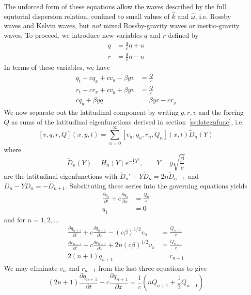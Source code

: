 \documentclass{jknotes}
\begin{document}
The unforced form of these equations allow the waves described by the full
equtorial dispersion relation, confined to small values of $\hat{k}$ and
$\hat{\omega}$, i.e. Rossby waves and Kelvin waves, but \emph{not} mixed
Rossby-gravity waves or inertio-gravity waves. To proceed, we introduce new
variables $q$ and $r$ defined by
\begin{align}
	q &= \frac{g}{c}\eta + u \\
	r &= \frac{g}{c}\eta - u
\end{align}
In terms of these variables, we have
\begin{align}
	q_t + c q_x + cv_y - \beta y v &= \frac{Q}{c} \\
	r_t - cr_x + cv_y + \beta y v &= \frac{Q}{c} \\
	cq_y + \beta y q &= \beta y r - c r_y
\end{align}
We now separate out the latitudinal component by writing $q, r, v$ and the
forcing $Q$ as sums of the latitudinal eigenfunctions derived in
section~\ref{ss:lategnfunc}, i.e.
\begin{equation}
	\left[v,q,r,Q\right](x,y,t) = \sum_{n=0}^\infty \left[ v_n, q_n, r_n,
	Q_n\right](x,t) \tilde{D}_n(Y)
\end{equation}
where
\begin{equation}
	\tilde{D}_n(Y) = H_n(Y) e^{-\frac{1}{2}Y^2}, \hspace{2em} Y =
	y\sqrt{\frac{\beta}{c}}
\end{equation}
are the latitudinal eigenfunctions with $\tilde{D}_n' + Y \tilde{D}_n = 2n
\tilde{D}_{n-1}$ and $\tilde{D}_n - Y \tilde{D}_n = - \tilde{D}_{n+1}$.
Substituting these series into the governing equations yields
\begin{align}
	\frac{\partial q_0}{\partial t} + c \frac{\partial q_0}{\partial x} &=
	\frac{Q_0}{c} \label{eq:15.21} \\
	q_1 &= 0
\end{align}
and for $n = 1, 2, \dots$ 
\begin{align}
	\frac{\partial q_{n+1}}{\partial t} + c \frac{\partial q_{n+1}}{\partial
	x} - (c\beta)^{1/2} v_n &= \frac{Q_{n+1}}{c} \label{eq:15.23}\\
	\frac{\partial r_{n-1}}{\partial t} - c \frac{\partial r_{n-1}}{\partial
	x} + 2n(c\beta)^{1/2} v_n &= \frac{Q_{n-1}}{c} \\
	2(n+1)q_{n+1} &= r_{n-1}\label{eq:15.25}
\end{align}
We may eliminate $v_n$ and $r_{n-1}$ from the last three equations to give
\begin{equation}
	(2n+1) \frac{\partial q_{n+1}}{\partial t} - c \frac{\partial
		q_{n+1}}{\partial x} = \frac{1}{c}\left(nQ_{n+1} +
	\frac{1}{2}Q_{n-1}\right) \label{eq:15.26}
\end{equation}
\end{document}
